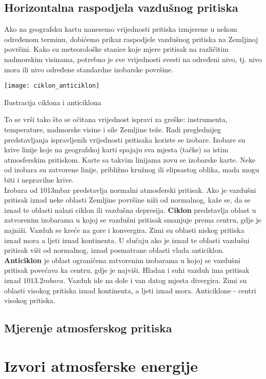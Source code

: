 	
	
	

	\subsection{Horizontalna raspodjela vazdušnog pritiska}
	Ako na geografsku kartu nanesemo vrijednosti pritiska izmjerene u nekom određenom terminu, dobićemo prikaz raspodjele vazdušnog pritiska na Zemljinoj površini. Kako su meteorološke stanice koje mjere pritisak na različitim nadmorskim visinama, potrebno je sve vrijednosti svesti na određeni nivo, tj. nivo mora ili nivo određene standardne izobarske površine. 
		\begin{marginfigure}%
		\texttt{[image: ciklon\_anticiklon]}
		\caption{Ilustracija ciklona i anticiklona}
		\label{fig:ciklon_anticiklon}
	\end{marginfigure}
	To se vrši tako što se očitana vrijednost ispravi za greške: instrumenta, temperature, nadmorske visine i sile Zemljine teže. Radi preglednijeg predstavljanja ispravljenih vrijednosti pritisaka koriste se izobare. Izobare su krive linije koje na geografskoj karti spajaju sva mjesta (tačke) sa istim atmosferskim pritiskom. Karte sa takvim linijama zovu se izobarske karte. Neke od izobara su zatvorene linije, približno kružnog ili elipsastog oblika, mada mogu biti i nepravilne krive. \\
	Izobara od 1013mbar predstavlja normalni atmosferski pritisak. Ako je vazdušni pritisak iznad neke oblasti Zemljine površine niži od normalnog, kaže se, da se iznad te oblasti nalazi ciklon ili vazdušna depresija. \textbf{Ciklon} predstavlja oblast u zatvorenim izobarama  u kojoj se vazdušni pritisak smanjuje prema centru, gdje je najniži. Vazduh se kreće na gore i konvergira. Zimi su oblasti niskog pritiska iznad mora a ljeti iznad kontinenta. U slučaju ako je iznad te oblasti vazdušni pritisak viši od normalnog, iznad posmatrane oblasti vlada anticiklon. \textbf{Anticiklon} je oblast ograničena zatvorenim izobarama u kojoj se vazdušni pritisak povećava ka centru, gdje je najviši.  Hladan i suhi vazduh ima pritisak iznad $1013.2 mbara$. Vazduh ide na dole i van datog mjesta divergira. Zimi su oblasti visokog pritiska iznad kontinenta,  a ljeti iznad mora. Anticiklone - centri visokog pritiska.
	
	
	\subsection{Mjerenje atmosferskog pritiska}
	
	
	\section{Izvori atmosferske energije}
